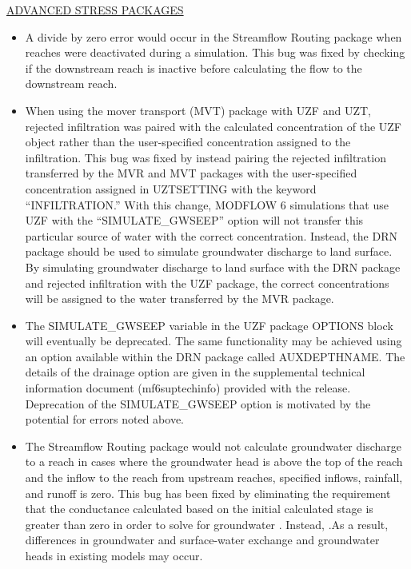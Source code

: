 	\underline{ADVANCED STRESS PACKAGES}
	\begin{itemize}
		\item A divide by zero error would occur in the Streamflow Routing package when reaches were deactivated during a simulation. This bug was fixed by checking if the downstream reach is inactive before calculating the flow to the downstream reach.
		\item When using the mover transport (MVT) package with UZF and UZT, rejected infiltration was paired with the calculated concentration of the UZF object rather than the user-specified concentration assigned to the infiltration.  This bug was fixed by instead pairing the rejected infiltration transferred by the MVR and MVT packages with the user-specified concentration assigned in UZTSETTING with the keyword ``INFILTRATION.''  With this change, MODFLOW 6 simulations that use UZF with the ``SIMULATE\_GWSEEP'' option will not transfer this particular source of water with the correct concentration.  Instead, the DRN package should be used to simulate groundwater discharge to land surface.  By simulating groundwater discharge to land surface with the DRN package and rejected infiltration with the UZF package, the correct concentrations will be assigned to the water transferred by the MVR package.
		\item The SIMULATE\_GWSEEP variable in the UZF package OPTIONS block will eventually be deprecated.  The same functionality may be achieved using an option available within the DRN package called AUXDEPTHNAME.  The details of the drainage option are given in the supplemental technical information document (mf6suptechinfo) provided with the release.  Deprecation of the SIMULATE_GWSEEP option is motivated by the potential for errors noted above.
		\item The Streamflow Routing package would not calculate groundwater discharge to a reach in cases where the groundwater head is above the top of the reach and the inflow to the reach from upstream reaches, specified inflows, rainfall, and runoff is zero. This bug has been fixed by eliminating the requirement that the conductance calculated based on the initial calculated stage is greater than zero in order to solve for groundwater . Instead, .As a result, differences in groundwater and surface-water exchange and groundwater heads in existing models may occur.  
	\end{itemize}



